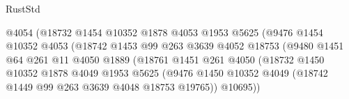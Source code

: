 \begin{lexlean}{RustStd}
\begin{coremodule}
                                      @4054
                                      (@18732
                                        @1454
                                        @10352
                                        @1878
                                        @4053
                                        @1953
                                        @5625
                                        (@9476
                                          @1454
                                          @10352
                                          @4053
                                          (@18742
                                            @1453
                                            @99
                                            @263
                                            @3639
                                            @4052
                                            @18753
                                            (@9480
                                              @1451
                                              @64
                                              @261
                                              @11
                                              @4050
                                              @1889
                                              (@18761
                                                @1451
                                                @261
                                                @4050
                                                (@18732
                                                  @1450
                                                  @10352
                                                  @1878
                                                  @4049
                                                  @1953
                                                  @5625
                                                  (@9476
                                                    @1450
                                                    @10352
                                                    @4049
                                                    (@18742
                                                      @1449
                                                      @99
                                                      @263
                                                      @3639
                                                      @4048
                                                      @18753
                                                      @19765))
                                                  @10695))

\end{coremodule}
\end{lexlean}
